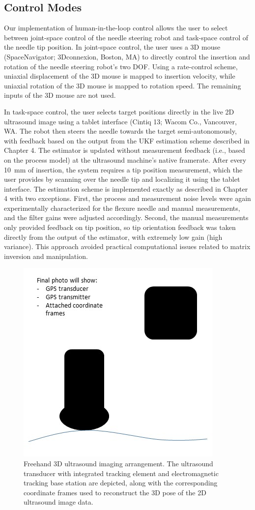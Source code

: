 \subsection{Control Modes}
Our implementation of human-in-the-loop control allows the user to select between joint-space control of the needle steering robot and task-space control of the needle tip position. In joint-space control, the user uses a 3D mouse (SpaceNavigator; 3Dconnexion, Boston, MA) to directly control the insertion and rotation of the needle steering robot's two DOF. Using a rate-control scheme, uniaxial displacement of the 3D mouse is mapped to insertion velocity, while uniaxial rotation of the 3D mouse is mapped to rotation speed. The remaining inputs of the 3D mouse are not used.

In task-space control, the user selects target positions directly in the live 2D ultrasound image using a tablet interface (Cintiq 13; Wacom Co., Vancouver, WA. The robot then steers the needle towards the target semi-autonomously, with feedback based on the output from the UKF estimation scheme described in Chapter 4. The estimator is updated without measurement feedback (i.e., based on the process model) at the ultrasound machine's native framerate. After every 10~mm of insertion, the system requires a tip position measurement, which the user provides by scanning over the needle tip and localizing it using the tablet interface. The estimation scheme is implemented exactly as described in Chapter 4 with two exceptions. First, the process and measurement noise levels were again experimentally characterized for the flexure needle and manual measurements, and the filter gains were adjusted accordingly. Second, the manual measurements only provided feedback on tip position, so tip orientation feedback was taken directly from the output of the estimator, with extremely low gain (high variance). This approach avoided practical computational issues related to matrix inversion and manipulation.

\begin{figure}[!t]
\centering
\includegraphics[width = 0.4\columnwidth]{./Images/Chapter5/Freehand3DUS/DRAFTFreehand3DUS.jpg}%
\caption[Freehand 3D ultrasound imaging arrangement]{Freehand 3D ultrasound imaging arrangement. The ultrasound transducer with integrated tracking element and electromagnetic tracking base station are depicted, along with the corresponding coordinate frames used to reconstruct the 3D pose of the 2D ultrasound image data.}
\label{fig:freehand3DUS}
\end{figure}  

